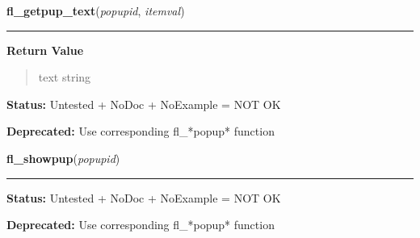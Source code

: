     \label{xformslib:library:fl_getpup_text}

    \vspace{0.5ex}

\hspace{.8\funcindent}\begin{boxedminipage}{\funcwidth}

    \raggedright \textbf{fl\_getpup\_text}(\textit{popupid}, \textit{itemval})

    \vspace{-1.5ex}

    \rule{\textwidth}{0.5\fboxrule}
\setlength{\parskip}{2ex}
\setlength{\parskip}{1ex}
      \textbf{Return Value}
    \vspace{-1ex}

      \begin{quote}
      text string

      \end{quote}

\textbf{Status:} Untested + NoDoc + NoExample = NOT OK



\textbf{Deprecated:} Use corresponding fl\_*popup* function



    \end{boxedminipage}

    \label{xformslib:library:fl_showpup}

    \vspace{0.5ex}

\hspace{.8\funcindent}\begin{boxedminipage}{\funcwidth}

    \raggedright \textbf{fl\_showpup}(\textit{popupid})

    \vspace{-1.5ex}

    \rule{\textwidth}{0.5\fboxrule}
\setlength{\parskip}{2ex}
\setlength{\parskip}{1ex}
\textbf{Status:} Untested + NoDoc + NoExample = NOT OK



\textbf{Deprecated:} Use corresponding fl\_*popup* function



    \end{boxedminipage}

